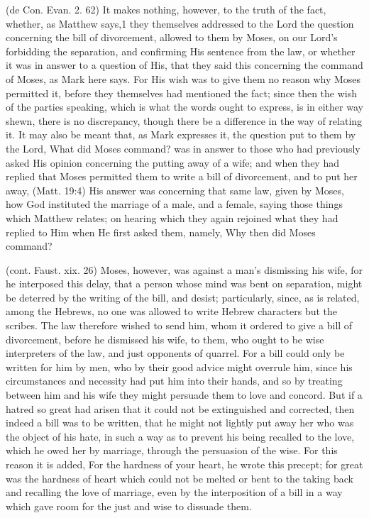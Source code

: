  (de Con. Evan. 2. 62) It makes nothing, however, to the truth of the fact, whether, as Matthew says,1 they themselves addressed to the Lord the question concerning the bill of divorcement, allowed to them by Moses, on our Lord’s forbidding the separation, and confirming His sentence from the law, or whether it was in answer to a question of His, that they said this concerning the command of Moses, as Mark here says. For His wish was to give them no reason why Moses permitted it, before they themselves had mentioned the fact; since then the wish of the parties speaking, which is what the words ought to express, is in either way shewn, there is no discrepancy, though there be a difference in the way of relating it. It may also be meant that, as Mark expresses it, the question put to them by the Lord, What did Moses command? was in answer to those who had previously asked His opinion concerning the putting away of a wife; and when they had replied that Moses permitted them to write a bill of divorcement, and to put her away, (Matt. 19:4) His answer was concerning that same law, given by Moses, how God instituted the marriage of a male, and a female, saying those things which Matthew relates; on hearing which they again rejoined what they had replied to Him when He first asked them, namely, Why then did Moses command?

 (cont. Faust. xix. 26) Moses, however, was against a man’s dismissing his wife, for he interposed this delay, that a person whose mind was bent on separation, might be deterred by the writing of the bill, and desist; particularly, since, as is related, among the Hebrews, no one was allowed to write Hebrew characters but the scribes. The law therefore wished to send him, whom it ordered to give a bill of divorcement, before he dismissed his wife, to them, who ought to be wise interpreters of the law, and just opponents of quarrel. For a bill could only be written for him by men, who by their good advice might overrule him, since his circumstances and necessity had put him into their hands, and so by treating between him and his wife they might persuade them to love and concord. But if a hatred so great had arisen that it could not be extinguished and corrected, then indeed a bill was to be written, that he might not lightly put away her who was the object of his hate, in such a way as to prevent his being recalled to the love, which he owed her by marriage, through the persuasion of the wise. For this reason it is added, For the hardness of your heart, he wrote this precept; for great was the hardness of heart which could not be melted or bent to the taking back and recalling the love of marriage, even by the interposition of a bill in a way which gave room for the just and wise to dissuade them.


